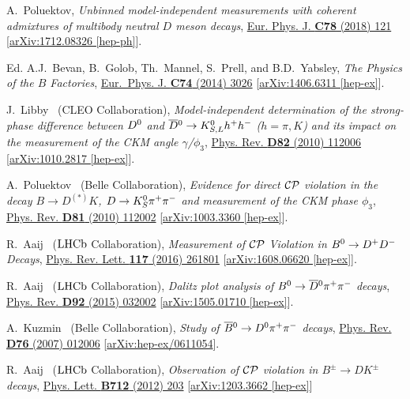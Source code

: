 \documentclass[a4paper,11pt]{article}
\begin{document}
\begin{thebibliography}{99}
A.~Poluektov,
\textit{Unbinned model-independent measurements with coherent admixtures of multibody neutral $D$ meson decays},
\href{https://doi.org/10.1140/epjc/s10052-018-5599-1}{Eur. Phys. J. \textbf{C78} (2018) 121}
[\href{https://arxiv.org/abs/1712.08326}{arXiv:1712.08326 [hep-ph]}].

Ed. A.J.~Bevan, B.~Golob, Th.~Mannel, S.~Prell, and B.D.~Yabsley, 
\textit{The Physics of the $B$ Factories}, 
\href{https://doi.org/10.1140/epjc/s10052-014-3026-9}{Eur.~Phys. J. \textbf{C74} (2014) 3026} 
[\href{https://arxiv.org/abs/1406.6311}{arXiv:1406.6311 [hep-ex]}].

J.~Libby \etal~(CLEO Collaboration),
\textit{Model-independent determination of the strong-phase difference between $D^0$ 
and $\overline{D}{}^0\to K_{S,L}^0 h^+ h^-$ ($h=\pi, K$) and its impact on the measurement of 
the CKM angle $\gamma$/$\phi_3$}, 
\href{https://doi.org/10.1103/PhysRevD.82.112006}{Phys. Rev. \textbf{D82} (2010) 112006} 
[\href{https://arxiv.org/abs/1010.2817}{arXiv:1010.2817 [hep-ex]}].

A.~Poluektov \etal~(Belle Collaboration), 
\textit{Evidence for direct $\mathcal{CP}$ violation in the decay $B\to D^{(*)}K$,
$D\to K_S^0\pi^+\pi^-$ and measurement of the CKM phase $\phi_3$}, 
\href{https://doi.org/10.1103/PhysRevD.81.112002}{Phys. Rev. \textbf{D81} (2010) 112002} 
[\href{https://arxiv.org/abs/1003.3360}{arXiv:1003.3360 [hep-ex]}].

R.~Aaij \etal~($\mathrm{LHCb}$ Collaboration), 
\textit{Measurement of $\mathcal{CP}$ Violation in $B^0\to D^+D^-$ Decays},
\href{https://doi.org/10.1103/PhysRevLett.117.261801}{Phys. Rev. Lett. \textbf{117} (2016) 261801} 
[\href{https://arxiv.org/abs/1608.06620}{arXiv:1608.06620 [hep-ex]}].

R.~Aaij \etal~($\mathrm{LHCb}$ Collaboration), 
\textit{Dalitz plot analysis of $B^0\to\overline{D}{}^0\pi^+\pi^-$ decays}, 
\href{https://doi.org/10.1103/PhysRevD.92.032002}{Phys. Rev. \textbf{D92} (2015) 032002} 
[\href{https://arxiv.org/abs/1505.01710}{arXiv:1505.01710 [hep-ex]}].

A.~Kuzmin \etal~(Belle Collaboration), 
\textit{Study of $\overline{B}{}^0\to D^0\pi^+\pi^-$ decays}, 
\href{https://doi.org/10.1103/PhysRevD.76.012006}{Phys. Rev. \textbf{D76} (2007) 012006} 
[\href{https://arxiv.org/abs/hep-ex/0611054}{arXiv:hep-ex/0611054}].

R.~Aaij \etal~($\mathrm{LHCb}$ Collaboration), 
\textit{Observation of $\mathcal{CP}$ violation in $B^{\pm}\to DK^{\pm}$ decays}, 
\href{https://doi.org/10.1016/j.physletb.2012.04.060}{Phys. Lett. \textbf{B712} (2012) 203} 
[\href{https://arxiv.org/abs/1203.3662}{arXiv:1203.3662 [hep-ex]}]


\end{thebibliography}
\end{document}
